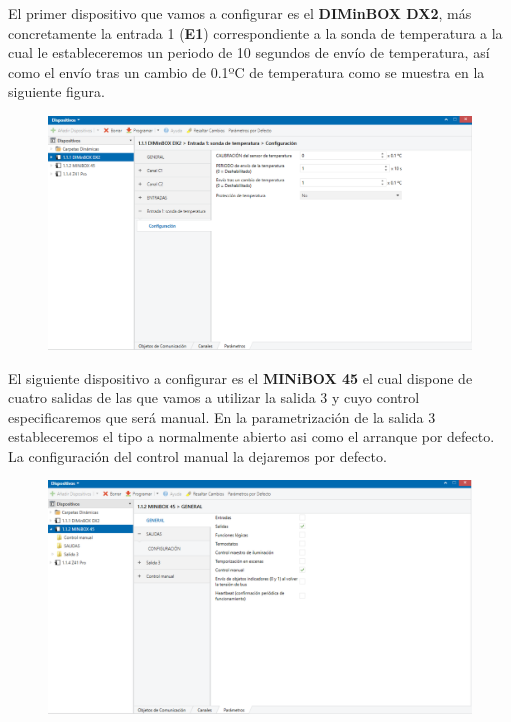 \documentclass[10pt]{article}
\begin{document}
El primer dispositivo que vamos a configurar es el \textbf{DIMinBOX DX2}, más concretamente la entrada 1 (\textbf{E1}) correspondiente a la sonda de temperatura a la cual le estableceremos un periodo de 10 segundos de envío de temperatura, así como el envío tras un cambio de 0.1ºC de temperatura como se muestra en la siguiente figura. \\

\begin{figure}[H]
	\begin{center}
	 		\includegraphics[width = 1.00\textwidth]{Imagenes/img20}
	\end{center} 
\end{figure}

El siguiente dispositivo a configurar es el \textbf{MINiBOX 45} el cual dispone de cuatro salidas de las que vamos a utilizar la salida 3 y cuyo control especificaremos que será manual. En la parametrización de la salida 3 estableceremos el tipo a normalmente abierto asi como el arranque por defecto.  La configuración del control manual la dejaremos por defecto. \\


\begin{figure}[H]
	\begin{center}
	 		\includegraphics[width = 1.00\textwidth]{Imagenes/img21}
	\end{center} 
\end{figure}
\end{document}
